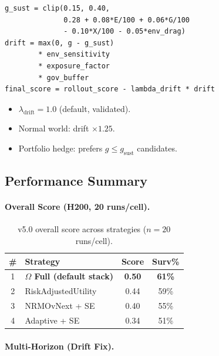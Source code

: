 \begin{lstlisting}[basicstyle=\ttfamily\scriptsize,frame=single]
g_sust = clip(0.15, 0.40,
              0.28 + 0.08*E/100 + 0.06*G/100
              - 0.10*X/100 - 0.05*env_drag)
drift = max(0, g - g_sust)
        * env_sensitivity
        * exposure_factor
        * gov_buffer
final_score = rollout_score - lambda_drift * drift
\end{lstlisting}

\begin{itemize}
\item $\lambda_{\mathrm{drift}} = 1.0$ (default, validated).
\item Normal world: drift $\times 1.25$.
\item Portfolio hedge: prefers $g \le g_{\mathrm{sust}}$ candidates.
\end{itemize}

\clearpage
\subsection{Performance Summary}
\label{sec:methodology-v50-perf}

\paragraph{Overall Score (H200, 20 runs/cell).}

\begin{table}[ht]
\centering
\small
\begin{tabularx}{\linewidth}{cXcc}
\toprule
\textbf{\#} & \textbf{Strategy} & \textbf{Score} & \textbf{Surv\%} \\
\midrule
1 & \textbf{$\Omega$ Full (default stack)} & \textbf{0.50}
& \textbf{61\%} \\
2 & RiskAdjustedUtility & 0.44 & 59\% \\
3 & NRMOvNext + SE & 0.40 & 55\% \\
4 & Adaptive + SE & 0.34 & 51\% \\
\bottomrule
\end{tabularx}
\caption[v5.0 overall score]{v5.0 overall score across strategies
($n = 20$ runs/cell).}
\label{tab:methodology-v50-overall}
\end{table}

\paragraph{Multi-Horizon (Drift Fix).}


